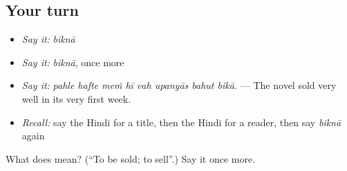 \subsection*{Your turn}
\begin{itemize}
\raggedright
  \item \emph{Say it:} \emph{biknā}
  \item \emph{Say it:} \emph{biknā}, once more
  \item \emph{Say it:} \emph{pahle hafte meṁ hī vah upanyās bahut bikā.} — The novel sold very well in its very first week.
  \item \emph{Recall:} say the Hindi for a title, then the Hindi for a reader, then say \emph{biknā} again
\end{itemize}

\begin{tcolorbox}[breakable,colback=teal!4,colframe=teal!35!black,title={Before you move on}]
What does  mean? (\textquotedblleft{}To be sold; to sell\textquotedblright{}.) Say it once more.
\end{tcolorbox}
